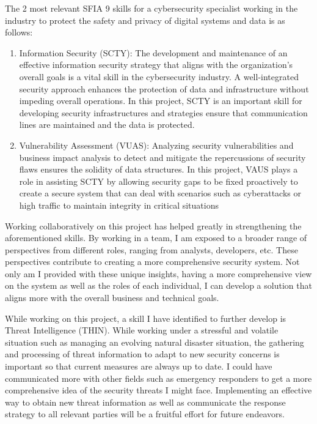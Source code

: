 \documentclass[a4paper, 11pt]{report}
\begin{document}
The 2 most relevant SFIA 9 skills for a cybersecurity specialist working in the industry to protect the safety and privacy of digital systems and data is as follows:

\begin{enumerate}

	\item Information Security (SCTY): The development and maintenance of an effective information security strategy that aligns with the organization's overall goals is a vital skill in the cybersecurity industry. A well-integrated security approach enhances the protection of data and infrastructure without impeding overall operations. In this project, SCTY is an important skill for developing security infrastructures and strategies ensure that communication lines are maintained and the data is protected.

	\item Vulnerability Assessment (VUAS): Analyzing security vulnerabilities and business impact analysis to detect and mitigate the repercussions of security flaws ensures the solidity of data structures. In this project, VAUS plays a role in assisting SCTY by allowing security gaps to be fixed proactively to create a secure system that can deal with scenarios such as cyberattacks or high traffic to maintain integrity in critical situations

\end{enumerate}

Working collaboratively on this project has helped greatly in strengthening the aforementioned skills. By working in a team, I am exposed to a broader range of perspectives from different roles, ranging from analysts, developers, etc. These perspectives contribute to creating a more comprehensive security system. Not only am I provided with these unique insights, having a more comprehensive view on the system as well as the roles of each individual, I can develop a solution that aligns more with the overall business and technical goals.

While working on this project, a skill I have identified to further develop is Threat Intelligence (THIN). While working under a stressful and volatile situation such as managing an evolving natural disaster situation, the gathering and processing of threat information to adapt to new security concerns is important so that current measures are always up to date. I could have communicated more with other fields such as emergency responders to get a more comprehensive idea of the security threats I might face. Implementing an effective way to obtain new threat information as well as communicate the response strategy to all relevant parties will be a fruitful effort for future endeavors.
\end{document}

